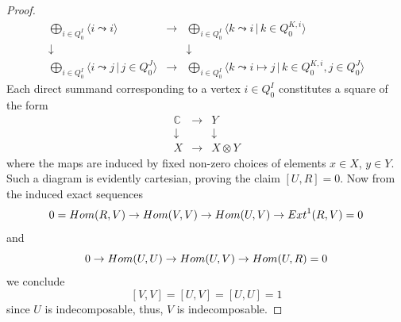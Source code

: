 \documentclass[10pt,a4paper]{amsart}
\begin{document}
\begin{proof}
$$\begin{array}{ccc}
\bigoplus_{i\in Q_0^I} \langle i\leadsto i\rangle&\rightarrow&\bigoplus_{i\in Q_0^I} \langle k\leadsto i\, |\, k\in Q_0^{K,i}\rangle\\
\downarrow&&\downarrow\\
\bigoplus_{i\in Q_0^I}\langle i\leadsto j\, |\, j\in Q_0^J\rangle&\rightarrow&\bigoplus_{i\in Q_0^I}\langle k\leadsto i\mapsto j\, |\, k\in Q_0^{K,i}, j\in Q_0^J\rangle\end{array}$$
Each direct summand corresponding to a vertex $i\in Q_0^I$ constitutes a square of the form
$$\begin{array}{ccc}\mathbb{C}&\rightarrow&Y\\ \downarrow&&\downarrow\\ X&\rightarrow&X\otimes Y\end{array}$$
where the maps are induced by fixed non-zero choices of elements $x\in X$, $y\in Y$. Such a diagram is evidently cartesian, proving the claim $[U,R]=0$. Now from the induced exact sequences
$$0={\rm Hom}(R,V)\rightarrow{\rm Hom}(V,V)\rightarrow{\rm Hom}(U,V)\rightarrow{\rm Ext}^1(R,V)=0$$
and
$$0\rightarrow{\rm Hom}(U,U)\rightarrow{\rm Hom}(U,V)\rightarrow{\rm Hom}(U,R)=0$$
we conclude
$$[V,V]=[U,V]=[U,U]=1$$
since $U$ is indecomposable, thus, $V$ is indecomposable.
\end{proof}
\end{document}
